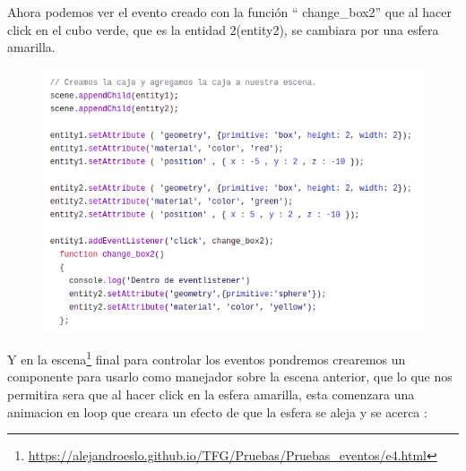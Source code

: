 \documentclass[a4paper, 12pt]{book}
\begin{document}
Ahora podemos ver el evento creado con la función “ change\_box2” que al hacer click en el cubo verde, que es la entidad 2(entity2), se cambiara por una esfera amarilla.

\begin{figure}[h]
\centering
 \includegraphics[scale=0.75]{img/escena1-2.png}
\end{figure}

\newpage
Y en la escena\footnote{\url{https://alejandroeslo.github.io/TFG/Pruebas/Pruebas_eventos/e4.html}} final para controlar los eventos pondremos crearemos un componente para usarlo como manejador sobre la escena anterior, que lo que nos permitira sera que al hacer click en la esfera amarilla, esta comenzara una animacion en loop que creara un efecto de que la esfera se aleja y se acerca :
\end{document}
